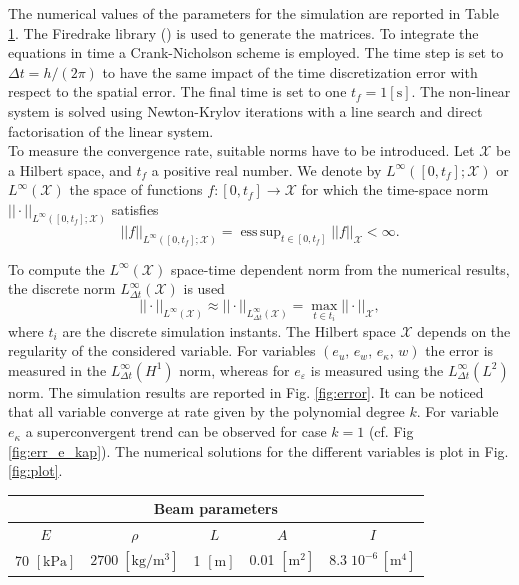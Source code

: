\documentclass{ifacconf}
\DeclareMathOperator*{\esssup}{ess\,sup}
\begin{document}
The numerical values of the parameters for the simulation are reported in Table \ref{tab:par}. The Firedrake library (\cite{rathgeber2017firedrake}) is used to generate the matrices. To integrate the equations in time a Crank-Nicholson scheme is employed. The time step is set to $\Delta t = h/(2 \pi)$ to have the same impact of the time discretization error with respect to the spatial error. The final time is set to one $t_f = 1 [\textrm{s}]$. The non-linear system is solved using Newton-Krylov iterations with a line search and direct factorisation of the linear system.  \\

To measure the convergence rate,  suitable norms have to be introduced. 
Let $\mathcal{X}$ be a Hilbert space, and $t_f$ a positive real number. We denote by $L^\infty([0, t_f]; \mathcal{X})$ or $L^\infty(\mathcal{X})$ the space of functions $f: [0, t_f] \rightarrow \mathcal{X}$ for which the time-space norm $||\cdot||_{L^\infty([0, t_f]; \mathcal{X})}$ satisfies
\[
||f||_{L^\infty([0, t_f]; \mathcal{X})} = \esssup_{t \in [0,t_f]} ||f||_{\mathcal{X}} < \infty.
\]

To compute the $L^\infty (\mathcal{X})$ space-time dependent norm from the numerical results, the discrete norm $L^\infty_{\Delta t} (\mathcal{X})$ is used
\[
||\cdot ||_{L^\infty (\mathcal{X})} \approx || \cdot ||_{L^\infty_{\Delta t} (\mathcal{X})} = \max_{t \in t_i} ||\cdot||_{\mathcal{X}},
\]
where $t_i$ are the discrete simulation instants. The Hilbert space $\mathcal{X}$ depends on the regularity of the considered variable. For variables $(e_u,\, e_w,\, e_\kappa,\, w)$ the error is measured in the $L^\infty_{\Delta t}(H^1)$ norm, whereas for $e_\varepsilon$ is measured using the $L^\infty_{\Delta t}(L^2)$ norm. The simulation results are reported in Fig. \ref{fig:error}. It can be noticed that all variable converge at rate given by the polynomial degree $k$. For variable $e_\kappa$ a superconvergent trend can be observed for case $k=1$ (cf. Fig \ref{fig:err_e_kap}). The numerical solutions for the different variables is plot in Fig. \ref{fig:plot}.


\begin{table}[h]
	\centering
	\begin{tabular}{ccccc}
		\hline 
		\multicolumn{5}{c}{Beam parameters} \\ 
		\hline 
		$E$ & $\rho$ & $L$  & $A$ & $I$ \\
		70 $[\textrm{kPa}]$ & $2700\; [\textrm{kg}/\textrm{m}^3]$ & 1 $[\textrm{m}]$ &  0.01 $[\textrm{m}^2]$ & $8.3 \; 10^{-6} \, [\textrm{m}^4]$\\ 
		\hline 
	\end{tabular} 
	\captionsetup{width=0.95\linewidth}
	\vspace{1mm}
	\label{tab:par}
\end{table}
\end{document}
